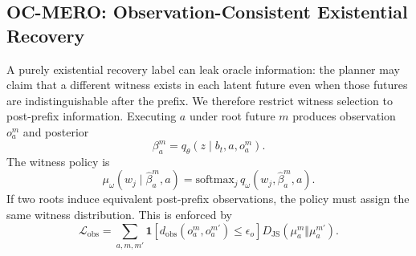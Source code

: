\documentclass[conference]{IEEEtran}
\begin{document}
\subsection{OC-MERO: Observation-Consistent Existential Recovery}
\label{subsec:oc_mero}

A purely existential recovery label can leak oracle information: the planner may claim that a different witness exists in each latent future even when those futures are indistinguishable after the prefix.  We therefore restrict witness selection to post-prefix information.  Executing $a$ under root future $m$ produces observation $o_a^m$ and posterior
\begin{equation}
\label{eq:method_posterior_new}
    \beta_a^m=q_\theta(z\mid b_t,a,o_a^m).
\end{equation}
The witness policy is
\begin{equation}
\label{eq:method_witness_policy}
    \mu_\omega(w_j\mid \widehat\beta_a^m,a)=
    \mathrm{softmax}_j\,q_\omega(w_j,\widehat\beta_a^m,a).
\end{equation}
If two roots induce equivalent post-prefix observations, the policy must assign the same witness distribution.  This is enforced by
\begin{equation}
\label{eq:method_obs_loss}
    \mathcal L_{\mathrm{obs}}=
    \sum_{a,m,m'}\mathbf 1[d_{\mathrm{obs}}(o_a^m,o_a^{m'})\le\epsilon_o]
    D_{\mathrm{JS}}(\mu_a^m\Vert\mu_a^{m'}).
\end{equation}
\end{document}
